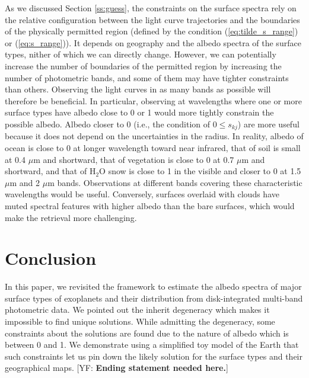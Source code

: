 \documentclass[iop,numberedappendix,apj]{emulateapj}
\def\memoYF#1{\color{red}[YF: {\bf #1}]\color{black}}
\begin{document}
As we discussed Section \ref{ss:guess}, the constraints on the surface spectra rely on the relative configuration between the light curve trajectories and the boundaries of the physically permitted region (defined by the condition (\ref{eq:tilde_s_range}) or (\ref{eq:s_range})). 
It depends on geography and the albedo spectra of the surface types, nither of which we can directly change. 
However, we can potentially increase the number of boundaries of the permitted region by increasing the number of photometric bands, and some of them may have tighter constraints than others. 
Observing the light curves in as many bands as possible will therefore be beneficial.  
In particular, observing at wavelengths where one or more surface types have albedo close to 0 or 1 would more tightly constrain the possible albedo. 
Albedo closer to 0 (i.e., the condition of $0 \le s_{kj}$) are more useful because it does not depend on the uncertainties in the radius. 
In reality, albedo of ocean is close to 0 at longer wavelength toward near infrared, that of soil is small at 0.4 $\mu $m and shortward, that of vegetation is close to 0 at 0.7 $\mu$m and shortward, and that of H$_2$O snow is close to 1 in the visible and closer to 0 at 1.5 $\mu$m and 2 $\mu$m bands. 
Observations at different bands covering these characteristic wavelengths would be useful. 
Conversely, surfaces overlaid with clouds have muted spectral features with higher albedo than the bare surfaces, which would make the retrieval more challenging. 





\section{Conclusion}
\label{s:conclusion}

In this paper, we revisited the framework to estimate the albedo spectra of major surface types of exoplanets and their distribution from disk-integrated multi-band photometric data. 
We pointed out the inherit degeneracy which makes it impossible to find unique solutions. 
While admitting the degeneracy, some constraints about the solutions are found due to the nature of albedo which is between 0 and 1. 
We demonstrate using a simplified toy model of the Earth that such constraints let us pin down the likely solution for the surface types and their geographical maps. 
\memoYF{Ending statement needed here.}
\end{document}
